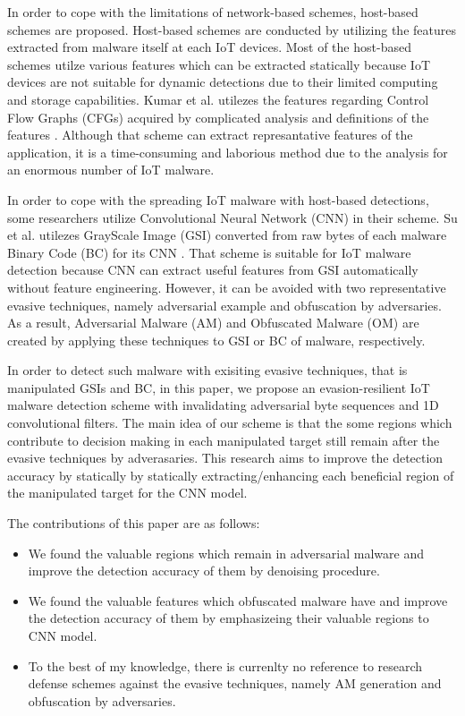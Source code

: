 \documentclass{ieeeaccess}
\begin{document}
In order to cope with the limitations of network-based schemes, host-based schemes are proposed.
Host-based schemes are conducted by utilizing the features extracted from malware itself at each IoT devices.
Most of the host-based schemes utilze various features which can be extracted statically because IoT devices are not suitable for dynamic detections due to their limited computing and storage capabilities.
Kumar et al. utilezes the features regarding Control Flow Graphs (CFGs) acquired by complicated analysis and definitions of the features \cite{cfg}.
Although that scheme can extract represantative features of the application, it is a time-consuming and laborious method due to the analysis for an enormous number of IoT malware.

In order to cope with the spreading IoT malware with host-based detections, some researchers utilize Convolutional Neural Network (CNN) in their scheme.
Su et al. utilezes GrayScale Image (GSI) converted from raw bytes of each malware Binary Code (BC) for its CNN \cite{previous}.
That scheme is suitable for IoT malware detection because CNN can extract useful features from GSI automatically without feature engineering.
However, it can be avoided with two representative evasive techniques, namely adversarial example and obfuscation by adversaries.
As a result, Adversarial Malware (AM) and Obfuscated Malware (OM) are created by applying these techniques to GSI or BC of malware, respectively.

In order to detect such malware with exisiting evasive techniques, that is manipulated GSIs and BC, in this paper, we propose an evasion-resilient IoT malware detection scheme with invalidating adversarial byte sequences and 1D convolutional filters.
The main idea of our scheme is that the some regions which contribute to decision making in each manipulated target still remain after the evasive techniques by adverasaries.
This research aims to improve the detection accuracy by statically by statically extracting/enhancing each beneficial region of the manipulated target for the CNN model.

The contributions of this paper are as follows: 
\begin{itemize}
 \item We found the valuable regions which remain in adversarial malware and improve the detection accuracy of them by denoising procedure.
 \item We found the valuable features which obfuscated malware have and improve the detection accuracy of them by emphasizeing their valuable regions to CNN model.
 \item To the best of my knowledge, there is currenlty no reference to research defense schemes against the evasive techniques, namely AM generation and obfuscation by adversaries. 
\end{itemize}
\end{document}
